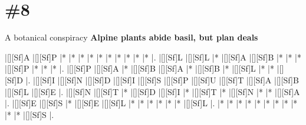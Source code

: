 \documentclass[letterpaper]{article}
\begin{document}
\newpage
\section*{\#8}
A botanical conspiracy
\newline\textbf{Alpine plants abide basil, but plan deals}

\vspace*{0.5em}
\begin{Puzzle}{12}{7}
|[][Sf]A  |[][Sf]P  |*        |*        |*        |*        |*        |*        |*        |*        |*        |*        |.  
|[][Sf]L  |[][Sf]L  |*        |[][Sf]A  |[][Sf]B  |*        |*        |*        |[][Sf]P  |*        |*        |*        |.
|[][Sf]P  |[][Sf]A  |*        |[][Sf]B  |[][Sf]A  |*        |[][Sf]B  |*        |[][Sf]L  |*        |*        |[][Sf]D  |.  
|[][Sf]I  |[][Sf]N  |[][Sf]D  |[][Sf]I  |[][Sf]S  |[][Sf]P  |[][Sf]U  |[][Sf]T  |[][Sf]A  |[][Sf]B  |[][Sf]L  |[][Sf]E  |.
|[][Sf]N  |[][Sf]T  |*        |[][Sf]D  |[][Sf]I  |*        |[][Sf]T  |*        |[][Sf]N  |*        |*        |[][Sf]A  |. 
|[][Sf]E  |[][Sf]S  |*        |[][Sf]E  |[][Sf]L  |*        |*        |*        |*        |*        |*        |[][Sf]L  |.
|*        |*        |*        |*        |*        |*        |*        |*        |*        |*        |*        |[][Sf]S  |.
\end{Puzzle}
\end{document}
